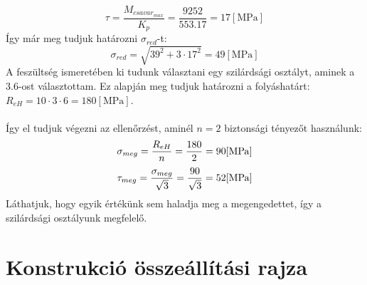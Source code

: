 \documentclass[10pt, a4paper]{article}
\newcommand{\mpa}{\mathrm{\left[MPa\right]}}
\begin{document}
	\begin{equation}
			\tau = \dfrac{M_{csavar_{max}}}{K_p} = \dfrac{9252}{553.17} = 17 \mpa\tag{6.2}
	\end{equation}
	\newpage
	Így már meg tudjuk határozni $\sigma_{red}$-t:
	\begin{equation}
		\sigma_{red} = \sqrt{39^2 + 3 \cdot 17^2} = 49 \mpa\tag{6}
	\end{equation}
	A feszültség ismeretében ki tudunk választani egy szilárdsági osztályt, aminek a 3.6-ost választottam. Ez alapján meg tudjuk határozni a folyáshatárt: $R_{eH} = 10 \cdot 3 \cdot 6 = 180 \mpa$.\\\\
	Így el tudjuk végezni az ellenőrzést, aminél $n = 2$ biztonsági tényezőt használunk:
	\begin{equation}
		\sigma_{meg} = \dfrac{R_{eH}}{n} = \dfrac{180}{2} = 90 \mpa\notag
	\end{equation}
	\begin{equation}
		\tau_{meg} = \dfrac{\sigma_{meg}}{\sqrt{3}} = \dfrac{90}{\sqrt{3}} = 52 \mpa\notag
	\end{equation}
	Láthatjuk, hogy egyik értékünk sem haladja meg a megengedettet, így a szilárdsági osztályunk megfelelő.
	\section{Konstrukció összeállítási rajza}
\end{document}
